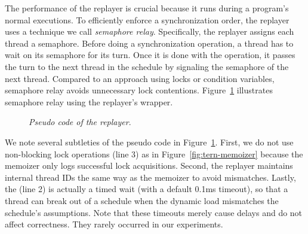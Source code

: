 The performance of the replayer is crucial because it runs during a
program's normal executions.  To efficiently enforce a synchronization
order, the replayer uses a technique we call \emph{semaphore relay}.
Specifically, the replayer assigns each thread a semaphore.  Before doing
a synchronization operation, a thread has to wait on its semaphore for its
turn.  Once it is done with the operation, it passes the turn to the next
thread in the schedule by signaling the semaphore of the next thread.
Compared to an approach using locks or condition variables, semaphore
relay avoids unnecessary lock contentions.  Figure~\ref{fig:tern-replayer}
illustrates semaphore relay using the replayer's
 wrapper.

\begin{figure}[t]
\begin{minipage}[c]{.8\linewidth}
\tiny {}
\end{minipage}
\caption{\small \emph{Pseudo code of the replayer}.}
\label{fig:tern-replayer}
\vspace{-.2in}
\end{figure}

We note several subtleties of the pseudo code in
Figure~\ref{fig:tern-replayer}.  First, we do not use non-blocking lock
operations (line 3) as in Figure~\ref{fig:tern-memoizer} because the memoizer only logs successful lock
acquisitions.  Second, the replayer maintains internal thread IDs the same
way as the memoizer to avoid mismatches.  Lastly, the  (line 2)
is actually a timed wait (with a default 0.1ms timeout), so that a
thread can break out of a schedule when the dynamic load mismatches the
schedule's assumptions.  Note that these timeouts merely cause delays and
do not affect correctness.  They rarely occurred in our experiments.






